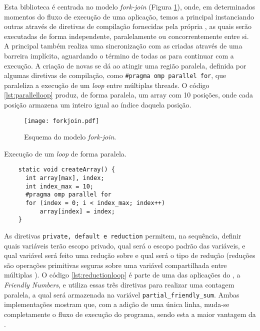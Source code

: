 Esta biblioteca é centrada no modelo \textit{fork-join} (Figura \ref{fig:forkjoin}), onde, em determinados momentos do fluxo de execução de uma aplicação, temos a \thread principal instanciando outras \threads através de diretivas de compilação fornecidas pela própria \API, as quais serão executadas de forma independente, paralelamente ou concorrentemente entre si. A \thread principal também realiza uma sincronização com as \threads criadas através de uma barreira implícita, aguardando o término de todas as \threads para continuar com a execução. A criação de novas \threads se dá ao atingir uma região paralela, definida por algumas diretivas de compilação, como \texttt{\#pragma omp parallel for}, que paraleliza a execução de um \textit{loop} entre múltiplas threads. O código \ref{lst:parallelloop} produz, de forma paralela, um array com 10 posições, onde cada posição armazena um inteiro igual ao índice daquela posição.


\begin{figure}[tb]
  \centering
  \caption{Esquema do modelo \textit{fork-join}.}
  \label{fig:forkjoin}
  \texttt{[image: forkjoin.pdf]}
\end{figure}

\begin{listing}[tb]
\caption{Execução de um \textit{loop} de forma paralela.}
\label{lst:parallelloop}
\begin{verbatim}
    static void createArray() {
      int array[max], index;
      int index_max = 10;
      #pragma omp parallel for
      for (index = 0; i < index_max; index++)
          array[index] = index;
    }
\end{verbatim}
\end{listing}

As diretivas \texttt{private, default e reduction} permitem, na sequência, definir quais variáveis terão escopo privado, qual será o escopo padrão das variáveis, e qual variável será feito uma redução sobre e qual será o tipo de redução (reduções são operações primitivas seguras sobre uma variável compartilhada entre múltiplas \threads). O código \ref{lst:reductionloop} é parte de uma das aplicações do \capb, a \textit{Friendly Numbers}, e utiliza essas três diretivas para realizar uma contagem paralela, a qual será armazenada na variável \texttt{partial\_friendly\_sum}. Ambas implementações mostram que, com a adição de uma única linha, muda-se completamente o fluxo de execução do programa, sendo esta a maior vantagem da \OpenMP.

